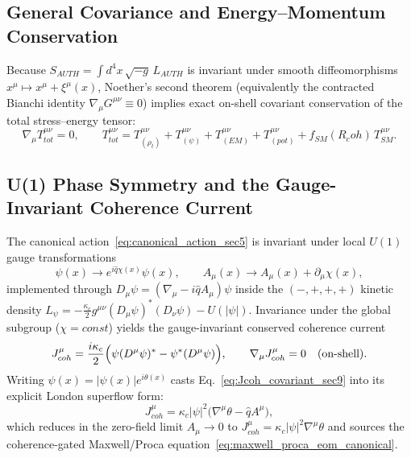 \documentclass[american,11pt,letterpaper]{article}
\newcommand{\Rcoh}{R_{\mathrm{coh}}}
\def\mathcal#1{#1}%
\def\mathrm#1{#1}%
\def\Rcoh{R_coh}%
\begin{document}
\subsection{General Covariance and Energy--Momentum Conservation}

Because $S_{\mathrm{AUTH}} = \int d^4x\,\sqrt{-g}\,\mathcal{L}_{\mathrm{AUTH}}$ is invariant under smooth diffeomorphisms $x^\mu \mapsto x^\mu + \xi^\mu(x)$, Noether's second theorem (equivalently the contracted Bianchi identity $\nabla_\mu G^{\mu\nu} \equiv 0$) implies exact on-shell covariant conservation of the total stress--energy tensor:
\[
\nabla_\mu T^{\mu\nu}_{\mathrm{tot}} = 0,
\qquad
T^{\mu\nu}_{\mathrm{tot}} = T^{\mu\nu}_{(\rho_t)} + T^{\mu\nu}_{(\psi)} + T^{\mu\nu}_{(\mathrm{EM})} + T^{\mu\nu}_{(\mathrm{pot})} + f_{\mathrm{SM}}(\Rcoh)\,T^{\mu\nu}_{\mathrm{SM}}.
\]

\subsection{U(1) Phase Symmetry and the Gauge-Invariant Coherence Current}

The canonical action~\eqref{eq:canonical_action_sec5} is invariant under local $U(1)$ gauge transformations
\begin{equation}
\psi(x) \to e^{i\hat{q}\chi(x)}\psi(x),
\qquad
A_\mu(x) \to A_\mu(x) + \partial_\mu\chi(x),
\label{eq:u1_gauge_transform_sec9}
\end{equation}
implemented through $D_\mu\psi = (\nabla_\mu - i\hat{q}A_\mu)\psi$ inside the $(-,+,+,+)$ kinetic density $\mathcal{L}_\psi = -\frac{\kappa_c}{2}g^{\mu\nu}(D_\mu\psi)^*(D_\nu\psi) - U(|\psi|)$. Invariance under the global subgroup ($\chi = \mathrm{const}$) yields the gauge-invariant conserved coherence current
\begin{equation}
J^\mu_{\mathrm{coh}}
= \frac{i\kappa_c}{2}\Bigl(\psi(D^\mu\psi)^* - \psi^*(D^\mu\psi)\Bigr),
\qquad
\nabla_\mu J^\mu_{\mathrm{coh}} = 0 \quad (\text{on-shell}).
\label{eq:Jcoh_covariant_sec9}
\end{equation}
Writing $\psi(x) = |\psi(x)| e^{i\theta(x)}$ casts Eq.~\eqref{eq:Jcoh_covariant_sec9} into its explicit London superflow form:
\begin{equation}
J^\mu_{\mathrm{coh}} = \kappa_c |\psi|^2 \bigl(\nabla^\mu\theta - \hat{q}A^\mu\bigr),
\label{eq:Jcoh_london_sec9}
\end{equation}
which reduces in the zero-field limit $A_\mu \to 0$ to $J^\mu_{\mathrm{coh}} = \kappa_c |\psi|^2 \nabla^\mu\theta$ and sources the coherence-gated Maxwell/Proca equation~\eqref{eq:maxwell_proca_eom_canonical}.
\end{document}
